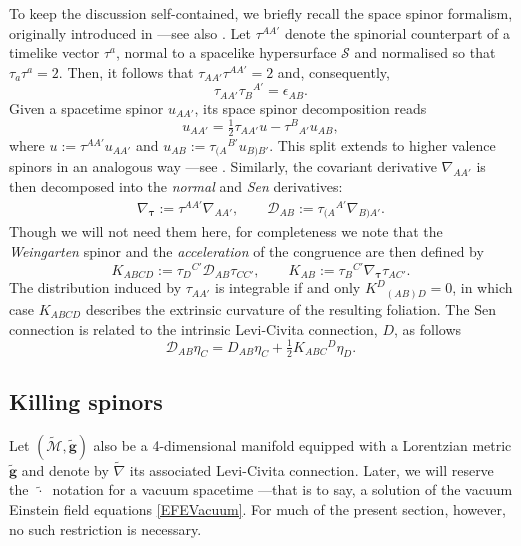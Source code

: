 \documentclass[10pt,a4paper]{article}
\theoremstyle{plain}
\def\bmg{{\bm g}}
\newcounter{mnotecount}%
\newcommand{\mnotex}[1]%
{\protect{\stepcounter{mnotecount}}$^{\mbox{\footnotesize $\bullet$\themnotecount}}$ 
\marginpar{%
\raggedright\tiny\em
$\!\!\!\!\!\!\,\bullet$\themnotecount: #1} }
\begin{document}
To keep the discussion self-contained, we briefly recall the space spinor
formalism, originally introduced in \cite{Som80}
---see also \cite{GarVal08c,BaeVal10b,CFEbook}.  Let $\tau^{AA'}$
denote the spinorial counterpart of a timelike vector $\tau^{a}$,
normal to a spacelike hypersurface $\mathcal{S}$ and normalised so
that $\tau_{a}\tau^{a}=2$.  Then, it follows that
$\tau_{AA'}\tau^{AA'}=2$ and, consequently,
\[\tau_{AA'}\tau_B{}^{A'}=\epsilon_{AB}.\]
Given a spacetime spinor $u_{AA'}$, its space spinor decomposition
reads
\[
u_{AA'}= \tfrac{1}{2}\tau_{AA'}u-\tau^{B}{}_{A'}u_{AB},
\]
where $u:=\tau^{AA'}u_{AA'}$ and $u_{AB}:=\tau_{(A}{}^{B'}u_{B)B'}$.
This split extends to higher valence spinors in an analogous way
---see \cite{GarVal08c,BaeVal10b,CFEbook}. Similarly, the covariant
derivative $\nabla_{AA'}$ is then decomposed into the \emph{normal}
and \emph{Sen} derivatives:
\begin{align*}
  \nabla_{\bm\tau} := \tau^{AA'}\nabla_{AA'},\qquad \mathcal{D}_{AB}:=
  \tau_{(A}{}^{A'}\nabla_{B)A'}.
\end{align*}
Though we will not need them here, for completeness we note that the
\emph{Weingarten} spinor and the \emph{acceleration} of the congruence
are then defined by
\[K_{ABCD} := \tau_{D}{}^{C'} \mathcal{D}_{AB}\tau_{CC'},\qquad K_{AB} := \tau_{B}{}^{C'} \nabla_{\bm\tau}\tau_{AC'}.
\]
The distribution induced by $\tau_{AA'}$ is integrable if and only
$K^D{}_{(AB)D}=0$, in which case $K_{ABCD}$ describes the extrinsic
curvature of the resulting foliation.
The Sen connection is related to the
intrinsic Levi-Civita connection, $D$, as follows
\[\mathcal{D}_{AB}\eta_C = D_{AB}\eta_C + \tfrac{1}{2}K_{ABC}{}^D\eta_D. \]

\subsection{Killing spinors}\label{Sec:KillingSpinors}

Let $(\tilde{\mathcal{M}},\tilde{\bmg})$ also be a
4-dimensional manifold equipped with a Lorentzian metric
$\tilde{\bmg}$ and denote by $\tilde{\nabla}$ its associated
Levi-Civita connection. Later, we will reserve the $~\tilde{\cdot}~$
notation for a vacuum spacetime ---that is to say, a solution of the
vacuum Einstein field equations \eqref{EFEVacuum}. For much of the present section, however, no such restriction is necessary.
\medskip
\end{document}
